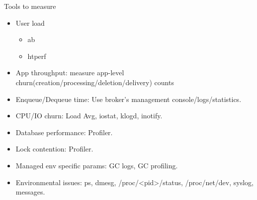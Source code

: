 \documentclass{beamer}
\begin{document}
\begin{frame}{Tools to measure}
  \begin{itemize}
    \item User load
      \begin{itemize}
        \item ab
        \item htperf
      \end{itemize}
      \pause
    \item App throughput: measure app-level churn(creation/processing/deletion/delivery) counts
      \pause
    \item Enqueue/Dequeue time: Use broker's management console/logs/statistics.
      \pause
    \item CPU/IO churn: Load Avg, iostat, klogd, inotify.
      \pause
    \item Database performance: Profiler.
      \pause
    \item Lock contention: Profiler.
      \pause
    \item Managed env specific params: GC logs, GC profiling.
      \pause
    \item Environmental issues: ps, dmesg, /proc/<pid>/status, /proc/net/dev, syslog, messages.
  \end{itemize}
\end{frame}





\end{document}
